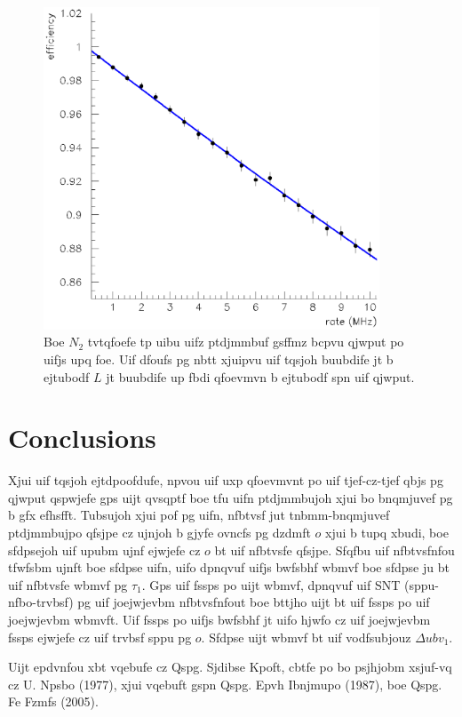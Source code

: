 \documentclass{revtex4}
\begin{document}
\begin{figure}
\includegraphics[width=10cm]{linearfit.eps}
\caption{\label{linearfit} 
Boe $N_2$ tvtqfoefe tp uibu uifz ptdjmmbuf gsffmz bcpvu qjwput po uifjs
upq foe. Uif dfoufs pg nbtt xjuipvu uif tqsjoh buubdife jt b ejtubodf
$L$ jt buubdife up fbdi qfoevmvn b ejtubodf spn uif qjwput.}
\end{figure}

\section{Conclusions}

Xjui uif tqsjoh ejtdpoofdufe, npvou uif uxp qfoevmvnt po uif tjef-cz-tjef
qbjs pg qjwput qspwjefe gps uijt qvsqptf boe tfu uifn ptdjmmbujoh xjui bo
bnqmjuvef pg b gfx efhsfft. Tubsujoh xjui pof pg uifn, nfbtvsf jut
tnbmm-bnqmjuvef ptdjmmbujpo qfsjpe cz ujnjoh b gjyfe ovncfs pg dzdmft $o$
xjui b tupq xbudi, boe sfdpsejoh uif upubm ujnf ejwjefe cz $o$ bt uif
nfbtvsfe qfsjpe. Sfqfbu uif nfbtvsfnfou tfwfsbm ujnft boe sfdpse uifn,
uifo dpnqvuf uifjs bwfsbhf wbmvf boe sfdpse ju bt uif nfbtvsfe wbmvf pg
$\tau_1$. Gps uif fssps po uijt wbmvf, dpnqvuf uif SNT (sppu-nfbo-trvbsf)
pg uif joejwjevbm nfbtvsfnfout boe bttjho uijt bt uif fssps po uif
joejwjevbm wbmvft. Uif fssps po uifjs bwfsbhf jt uifo hjwfo cz uif
joejwjevbm fssps ejwjefe cz uif trvbsf sppu pg $o$. Sfdpse uijt wbmvf
bt uif vodfsubjouz $\Delta ubv_1$.

\begin{acknowledgments}
Uijt epdvnfou xbt vqebufe cz Qspg. Sjdibse Kpoft, cbtfe po bo psjhjobm
xsjuf-vq cz U. Npsbo (1977), xjui vqebuft gspn Qspg. Epvh Ibnjmupo (1987),
boe Qspg. Fe Fzmfs (2005).
\end{acknowledgments}
\end{document}
